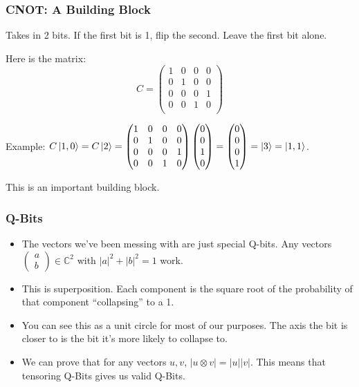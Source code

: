 \documentclass{beamer}
\newcommand{\C}{\mathbb{C}}
\begin{document}
\begin{frame}
\frametitle{CNOT: A Building Block}
Takes in 2 bits. If the first bit is 1, flip the second. Leave the first bit alone.

Here is the matrix:
\[
    C = 
    \begin{pmatrix}
    1 & 0 & 0 & 0 \\
    0 & 1 & 0 & 0 \\
    0 & 0 & 0 & 1 \\
    0 & 0 & 1 & 0 \\
    \end{pmatrix}
\]

Example: $C \ket{1, 0} = C \ket{2} = \begin{pmatrix} 1 & 0 & 0 & 0 \\ 0 & 1 & 0 & 0 \\ 0 & 0 & 0 & 1 \\ 0 & 0 & 1 & 0 \end{pmatrix} \begin{pmatrix}0 \\ 0 \\ 1 \\ 0 \end{pmatrix} = \begin{pmatrix}0 \\ 0 \\ 0 \\ 1 \end{pmatrix} = \ket{3} = \ket{1,1}$.

This is an important building block.
\end{frame}

\begin{frame}
\frametitle{Q-Bits}
\begin{itemize}
    \item The vectors we've been messing with
are just special Q-bits.
Any vectors $\begin{pmatrix}a\\b\end{pmatrix} \in \C^2$
with $|a|^2 + |b|^2 = 1$ work.

    \item This is superposition. Each component
    is the square root of the probability
    of that component ``collapsing'' to a 1.
    
    \item You can see this as a
    unit circle for most of
    our purposes. The axis the bit
    is closer to is the bit it's
    more likely to collapse to.

    \item We can prove that for any vectors
    $u, v$, $|u \otimes v| = |u| |v|$.
    This means that tensoring Q-Bits
    gives us valid Q-Bits.
\end{itemize}
\end{frame}
\end{document}

